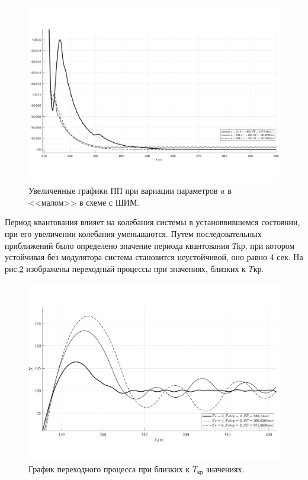 \begin{figure}[!h]\centering
	\includegraphics[width=1\linewidth]{images/final_VSS_PWM_a_zoom}
	\caption{ Увеличенные графики ПП при вариации параметров $a$ в <<малом>> в схеме с ШИМ.}\label{fig:final_VSS_PWM_a_zoom}
\end{figure}

Период квантования влияет на колебания системы в установвившемся состоянии, при его увеличении колебания уменьшаются.
Путем последовательных 
приближений было определено значение периода квантования $T{\text{кр}}$, при 
котором устойчивая без модулятора система становится неустойчивой, оно равно 4 сек.
На рис.\ref{fig:final_VSS_PWM_Ts45_gran} изображены переходный процессы при значениях, близких к $T{\text{кр}}$.

\begin{figure}[!h]\centering
	\includegraphics[width=1\linewidth]{images/final_VSS_PWM_Ts45_gran}
	\caption{ График переходного процесса при близких к $T_{\text{кр}}$ значениях.}\label{fig:final_VSS_PWM_Ts45_gran}
\end{figure}


